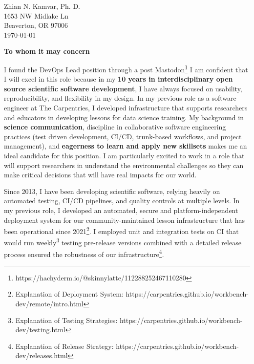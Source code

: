 


\clearpage
\begin{flushright}
  Zhian N. Kamvar, Ph. D.\\
  1653 NW Midlake Ln\\
  Beaverton, OR 97006\\
  \today
\end{flushright}

\textbf{To whom it may concern}

\vspace{2ex}

I found the DevOps Lead position through a post 
Mastodon\footnote{https://hachyderm.io/@skinnylatte/112288252467110280} 
I am confident that I will excel in
this role because in my \textbf{10 years in interdisciplinary open source
scientific software development}, I have always focused on usability,
reproducibility, and flexibility in my design.
In my previous role as a software engineer at The Carpentries, I developed
infrastructure that supports researchers and educators in developing lessons
for data science training.
My background in \textbf{science communication}, discipline in collaborative
software engineering practices (test driven development, CI/CD, trunk-based
workflows, and project management), and \textbf{eagerness to learn and apply
new skillsets} makes me an ideal candidate for this position. 
I am particularly excited to work in a role that will support researchers in
understand the environmental challenges so they can make critical decisions
that will have real impacts for our world.



\vspace{2ex}

Since 2013, I have been developing scientific software, relying heavily on
automated testing, CI/CD pipelines, and quality controls at multiple levels.
In my previous role, I developed an automated, secure and platform-independent deployment system for our community-maintained lesson infrastructure that has been operational since 2021\footnote{Explanation of Deployment System: https://carpentries.github.io/workbench-dev/remote/intro.html}. I employed unit and integration tests on CI that would run weekly\footnote{Explanation of Testing Strategies: https://carpentries.github.io/workbench-dev/testing.html} testing pre-release versions combined with a detailed release process ensured the robustness of our infrastructure\footnote{Explanation of Release Strategy: https://carpentries.github.io/workbench-dev/releases.html}.

